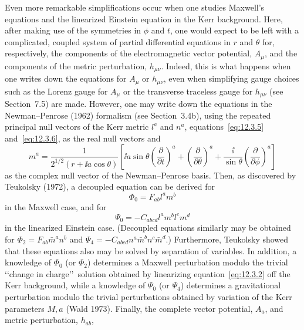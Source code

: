 Even more remarkable simplifications occur when one studies Maxwell's equations
and the linearized Einstein equation in the Kerr background. Here, after making use
of the symmetries in \(\phi\) and \(t\), one would expect to be left with a complicated,
coupled system of partial differential equations in \(r\) and \(\theta\) for,
respectively, the components of the electromagnetic vector potential, \(A_\mu\), and
the components of the metric perturbation, \(h_{\mu\nu}\). Indeed, this is what
happens when one writes down the equations for \(A_\mu\) or \(h_{\mu\nu}\), even
when simplifying gauge choices such as the Lorenz gauge for \(A_\mu\) or the
transverse traceless gauge for \(h_{\mu\nu}\) (see Section~7.5) are made. However,
one may write down the equations in the Newman--Penrose (1962) formalism (see
Section~3.4b), using the repeated principal null vectors of the Kerr metric \(l^a\)
and \(n^a\), equations~\eqref{eq:12.3.5} and~\eqref{eq:12.3.6}, as the real null
vectors and
\begin{equation}
 m^a=\frac{1}{2^{1/2}(r+\ii a\cos\theta)}
 \left[\ii a\sin\theta\left(\frac{\partial}{\partial t}\right)^a+
       \left(\frac{\partial}{\partial\theta}\right)^a+
       \frac{\ii}{\sin\theta}\left(\frac{\partial}{\partial\phi}\right)^a\right]
 \tag{12.3.28}\label{eq:12.3.28}
\end{equation}
as the complex null vector of the Newman--Penrose basis. Then, as discovered by
Teukolsky (1972), a decoupled equation can be derived for
\begin{equation}
 \Phi_0=F_{ab}l^am^b
 \tag{12.3.29}\label{eq:12.3.29}
\end{equation}
in the Maxwell case, and for
\begin{equation}
 \Psi_0=-C_{abcd}l^am^bl^cm^d
 \tag{12.3.30}\label{eq:12.3.30}
\end{equation}
in the linearized Einstein case. (Decoupled equations similarly may be obtained for
\(\Phi_2=F_{ab}\bar m^an^b\) and
\(\Psi_4=-C_{abcd}n^a\bar m^bn^c\bar m^d\).) Furthermore, Teukolsky showed that
these equations also may be solved by separation of variables. In addition, a
knowledge of \(\Phi_0\) (or \(\Phi_2\)) determines a Maxwell perturbation modulo
the trivial \lq\lq change in charge\rq\rq\ solution obtained by linearizing
equation~\eqref{eq:12.3.2} off the Kerr background, while a knowledge of \(\Psi_0\)
(or \(\Psi_4\)) determines a gravitational perturbation modulo the trivial
perturbations obtained by variation of the Kerr parameters \(M,a\) (Wald 1973).
Finally, the complete vector potential, \(A_a\), and metric perturbation, \(h_{ab}\),
